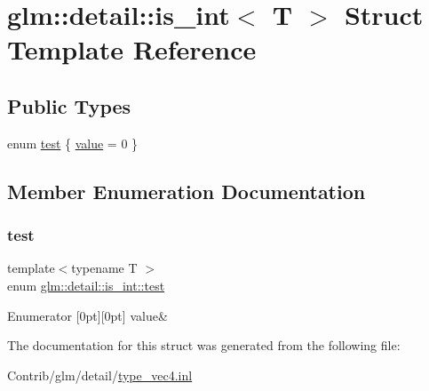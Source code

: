 \hypertarget{structglm_1_1detail_1_1is__int}{}\section{glm\+:\+:detail\+:\+:is\+\_\+int$<$ T $>$ Struct Template Reference}
\label{structglm_1_1detail_1_1is__int}
\subsection*{Public Types}
\begin{DoxyCompactItemize}
\item 
enum \mbox{\hyperlink{structglm_1_1detail_1_1is__int_a6a1d15bd1184bc07664114fa30199e01}{test}} \{ \mbox{\hyperlink{structglm_1_1detail_1_1is__int_a6a1d15bd1184bc07664114fa30199e01a788143fb0374c29be9a2f50e5c493c1b}{value}} = 0
 \}
\end{DoxyCompactItemize}


\subsection{Member Enumeration Documentation}
\mbox{\label{structglm_1_1detail_1_1is__int_a6a1d15bd1184bc07664114fa30199e01}} 
\subsubsection{\texorpdfstring{test}{test}}
{\footnotesize\ttfamily template$<$typename T $>$ \\
enum \mbox{\hyperlink{structglm_1_1detail_1_1is__int_a6a1d15bd1184bc07664114fa30199e01}{glm\+::detail\+::is\+\_\+int\+::test}}}

\begin{DoxyEnumFields}{Enumerator}
[0pt][0pt]{}\mbox{\label{structglm_1_1detail_1_1is__int_a6a1d15bd1184bc07664114fa30199e01a788143fb0374c29be9a2f50e5c493c1b}} 
value&\\
\hline

\end{DoxyEnumFields}


The documentation for this struct was generated from the following file\+:\begin{DoxyCompactItemize}
\item 
Contrib/glm/detail/\mbox{\hyperlink{type__vec4_8inl}{type\+\_\+vec4.\+inl}}\end{DoxyCompactItemize}
